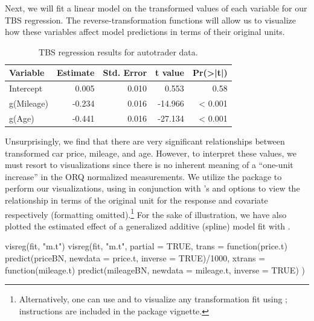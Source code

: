Next, we will fit a linear model on the transformed values of each
variable for our TBS regression. The reverse-transformation functions
will allow us to visualize how these variables affect model predictions
in terms of their original units.

\begin{Schunk}
\end{Schunk}

\begin{Schunk}
\begin{table}

\caption{\label{tab:unnamed-chunk-11}TBS regression results for autotrader data.}
\centering
\begin{tabular}[t]{lrrrr}
\toprule
Variable & Estimate & Std. Error & t value & Pr(>|t|)\\
\midrule
Intercept & 0.005 & 0.010 & 0.553 & 0.58\\
g(Mileage) & -0.234 & 0.016 & -14.966 & < 0.001\\
g(Age) & -0.441 & 0.016 & -27.134 & < 0.001\\
\bottomrule
\end{tabular}
\end{table}

\end{Schunk}

Unsurprisingly, we find that there are very significant relationships
between transformed car price, mileage, and age. However, to interpret
these values, we must resort to visualizations since there is no
inherent meaning of a ``one-unit increase'' in the ORQ normalized
measurements. We utilize the  package \citep{visreg} to
perform our visualizations, using  in
conjunction with 's  and  options
to view the relationship in terms of the original unit for the response
and covariate respectively (formatting
omitted).\footnote{Alternatively, one can use  \citep{scales} and  \citep{ggplot2} to visualize any transformation fit using ; instructions are included in the package vignette.}
For the sake of illustration, we have also plotted the estimated effect
of a generalized additive (spline) model fit with 
\citep{mgcv}.

\begin{Schunk}
\begin{Sinput}
visreg(fit, "m.t")
visreg(fit, "m.t", 
       partial = TRUE,
       trans = function(price.t) 
         predict(priceBN, newdata = price.t, inverse = TRUE)/1000, 
       xtrans = function(mileage.t) 
         predict(mileageBN, newdata = mileage.t, inverse = TRUE)
)
\end{Sinput}
\end{Schunk}

